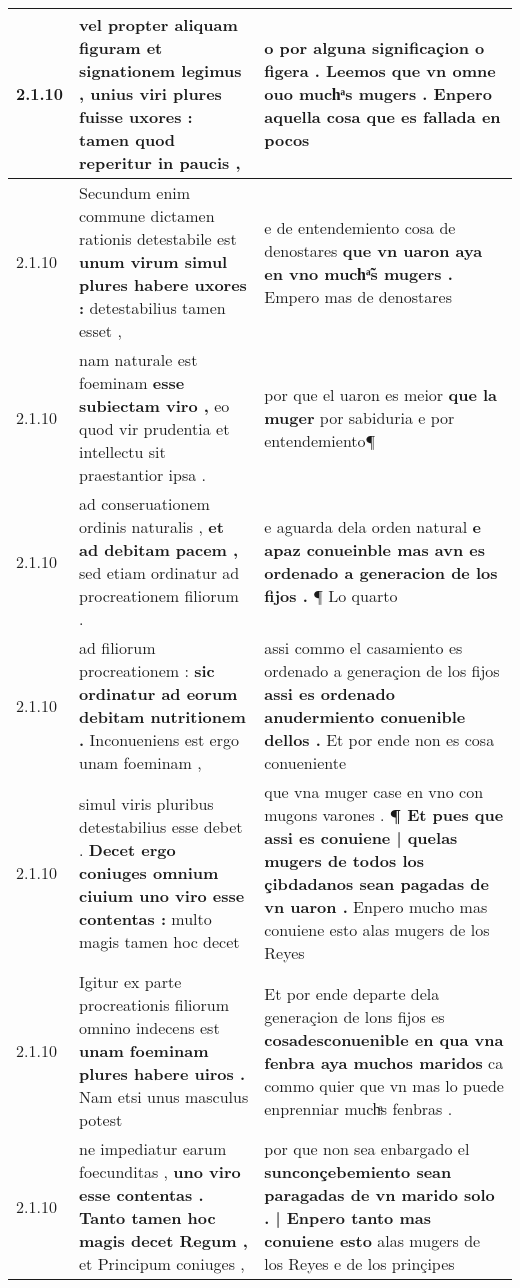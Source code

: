 \begin{tabular}{|p{1cm}|p{6.5cm}|p{6.5cm}|}
2.1.10 & vel propter aliquam figuram \textbf{ et signationem legimus , unius viri plures fuisse uxores : } tamen quod reperitur in paucis , & o por alguna significaçion o figera . \textbf{ Leemos que vn omne ouo muchͣs mugers . } Enpero aquella cosa que es fallada en pocos \\\hline
2.1.10 & Secundum enim commune dictamen rationis detestabile est \textbf{ unum virum simul plures habere uxores : } detestabilius tamen esset , & e de entendemiento cosa de denostares \textbf{ que vn uaron aya en vno muchͣ̃s mugers . } Empero mas de denostares \\\hline
2.1.10 & nam naturale est foeminam \textbf{ esse subiectam viro , } eo quod vir prudentia et intellectu sit praestantior ipsa . & por que el uaron es meior \textbf{ que la muger } por sabiduria e por entendemiento¶ \\\hline
2.1.10 & ad conseruationem ordinis naturalis , \textbf{ et ad debitam pacem , } sed etiam ordinatur ad procreationem filiorum . & e aguarda dela orden natural \textbf{ e apaz conueinble mas avn es ordenado a generacion de los fijos . } ¶ Lo quarto \\\hline
2.1.10 & ad filiorum procreationem : \textbf{ sic ordinatur ad eorum debitam nutritionem . } Inconueniens est ergo unam foeminam , & assi commo el casamiento es ordenado a generaçion de los fijos \textbf{ assi es ordenado anudermiento conuenible dellos . } Et por ende non es cosa conueniente \\\hline
2.1.10 & simul viris pluribus detestabilius esse debet . \textbf{ Decet ergo coniuges omnium ciuium uno viro esse contentas : } multo magis tamen hoc decet & que vna muger case en vno con mugons varones . \textbf{ ¶ Et pues que assi es conuiene | quelas mugers de todos los çibdadanos sean pagadas de vn uaron . } Enpero mucho mas conuiene esto alas mugers de los Reyes \\\hline
2.1.10 & Igitur ex parte procreationis filiorum omnino indecens est \textbf{ unam foeminam plures habere uiros . } Nam etsi unus masculus potest & Et por ende departe dela generaçion de lons fijos es \textbf{ cosadesconuenible en qua vna fenbra aya muchos maridos } ca commo quier que vn mas lo puede enprenniar muchͣs fenbras . \\\hline
2.1.10 & ne impediatur earum foecunditas , \textbf{ uno viro esse contentas . Tanto tamen hoc magis decet Regum , } et Principum coniuges , & por que non sea enbargado el \textbf{ sunconçebemiento sean paragadas de vn marido solo . | Enpero tanto mas conuiene esto } alas mugers de los Reyes e de los prinçipes \\\hline

\end{tabular}
